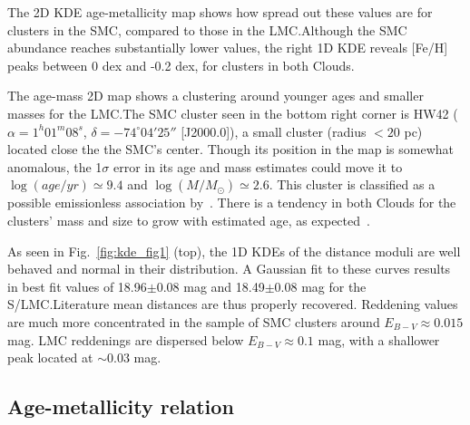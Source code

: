 \documentclass{aa}
\begin{document}
The 2D KDE age-metallicity map shows how spread out these values are for
clusters in the SMC, compared to those in the LMC.\@ Although the SMC abundance
reaches substantially lower values, the right 1D KDE reveals [Fe/H] peaks
between 0 dex and -0.2 dex, for clusters in both Clouds.

The age-mass 2D map shows a clustering around younger ages and smaller masses
for the LMC.\@ The SMC cluster seen in the bottom right corner is HW42
($\alpha{=}1^h01^m08^s$, $\delta{=}-74^\circ04'25''$ [J2000.0]),
a small cluster (radius ${<}20$ pc) located close the the SMC's center. Though
its position in the map is somewhat anomalous, the 1$\sigma$ error in its age
and mass estimates could move it to
$\log(age/yr){\simeq}9.4$ and $\log(M/M_{\odot}){\simeq}2.6$. This cluster is
classified as a possible emissionless association by~\mbox{\cite{Bica_1995}}.
%
There is a tendency in both Clouds for the clusters' mass and size to
grow with estimated age, as expected~\citep[due to the mass-to-light ratio
increase with age; see][Sect. 4]{Popescu_2012}.

As seen in Fig.~\ref{fig:kde_fig1} (top), the 1D KDEs of the distance
moduli are well behaved and normal in their distribution.
A Gaussian fit to these curves results in best fit values of 18.96$\pm$0.08 mag
and 18.49$\pm$0.08 mag for the S/LMC.\@ Literature mean distances are thus
properly recovered.
%
Reddening values are much more concentrated in the sample of SMC clusters
around $E_{B-V}{\approx}0.015$ mag. LMC reddenings are dispersed below $E_{B-V}
{\approx}0.1$ mag, with a shallower peak located at ${\sim}0.03$ mag.
%


\subsection{Age-metallicity relation}
\label{ssec:amr}
\end{document}
